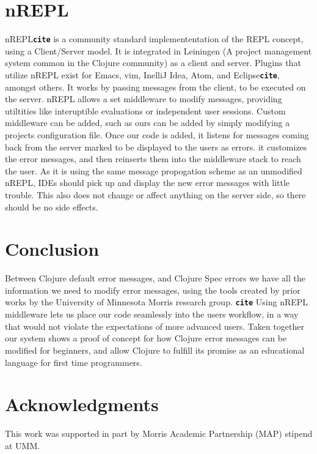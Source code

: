\documentclass[12pt]{article}
\newcommand{\comment}[1]{{\bf \tt  {#1}}}
\begin{document}
\section{nREPL}
nREPL\comment{cite} is a community standard implemententation of the REPL concept,
 using a Client/Server model. It is integrated in Leiningen
  (A project management system common in the Clojure community) as a client and server.
 Plugins that utilize nREPL exist for Emacs, vim, InelliJ Idea, Atom, and Eclipse\comment{cite}, amongst others.
It works by passing messages from the client, to be executed on the server.
nREPL allows a set middleware to modify messages, providing utiltities
like interuptible evaluations or independent user sessions.
Custom middleware can be added, such as ours can be added by simply
modifying a projects configuration file. Once our code is added,
it listens for messages coming back from the server
marked to be displayed to the users as errors.
it customizes the error messages, and then reinserts them into the middleware stack
to reach the user. As it is using the same message propogation scheme as an unmodified nREPL,
IDEs should pick up and display the new error messages with little trouble.
This also does not change or affect anything on the server side, so there should
be no side effects.

\section{Conclusion}
Between Clojure default error messages, and Clojure Spec errors
we have all the information we need to modify error messages, using the
tools created by prior works by the University of Minnesota Morris research group. \comment{cite}
Using nREPL middleware lets us place our code seamlessly into the users
workflow, in a way that would not violate the expectations of more advanced users.
 Taken together our system shows a proof of concept for how Clojure
error messages can be modified for beginners, and allow Clojure to fulfill
its promise as an educational language for first time programmers.

\section{Acknowledgments}
This work was supported in part by Morris Academic Partnership (MAP) stipend at UMM.




\end{document}
